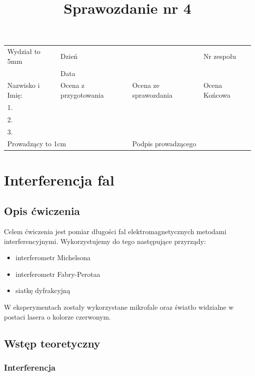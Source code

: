 \documentclass[a4paper]{article}
\title{Sprawozdanie nr 4}
\date{}
\newcommand{\Vsp}[1]{\vtop to #1 {}}
\newcommand{\Small}{\scriptsize}
\begin{document}
\begin{center}
\begin{tabular}{|p{5cm}|l|l|l|}
    \hline
    Wydział \Vsp{5mm} & \multicolumn{1}{|l}{Dzień} &  & Nr zespołu\\
    & \multicolumn{1}{|l}{Data} &  & \\
    \hline 
    Nazwisko i Imię: & \Small Ocena z przygotowania  & \Small Ocena ze sprawozdania & \Small Ocena Końcowa \\
    1. & & &\\
    2. & & & \\
    3. & & & \\
    \hline
    \multicolumn{2}{|l|}{Prowadzący \Vsp{1cm}} & \multicolumn{2}{|l|}{Podpis prowadzącego} \\
    \hline
\end{tabular}
\end{center}

{\let\newpage\relax\maketitle}
\setcounter{secnumdepth}{2}
\setcounter{tocdepth}{2}

\section{Interferencja fal} %

\subsection{Opis ćwiczenia}

Celem ćwiczenia jest pomiar długości fal elektromagnetycznych metodami interferencyjnymi.
Wykorzystujemy do tego następujące przyrządy:
\begin{itemize}
\item interferometr Michelsona
\item interferometr Fabry-Perotaa
\item siatkę dyfrakcyjną
\end{itemize}
W eksperymentach zostały wykorzystane mikrofale oraz światło widzialne w postaci lasera o kolorze czerwonym.

\subsection{Wstęp teoretyczny}

\subsubsection{Interferencja}
\end{document}
